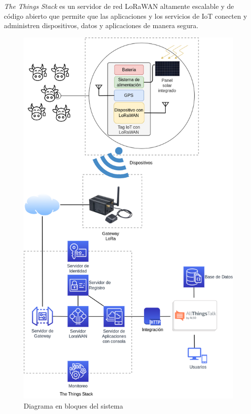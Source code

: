 \documentclass[
11pt, %
]{charter}
\begin{document}
\emph{The Things Stack} es un servidor de red LoRaWAN altamente escalable y de código abierto que permite que las aplicaciones y los servicios de IoT conecten y administren dispositivos, datos y aplicaciones de manera segura. 

\begin{figure}[htpb]
\centering 
\includegraphics[width=.7\textwidth]{./Figuras/diagBloques.png}
\caption{Diagrama en bloques del sistema}
\label{fig:diagBloques}
\end{figure}
\end{document}
